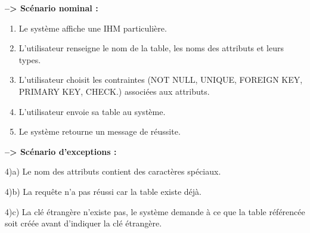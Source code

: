 \textbf{--> Scénario nominal :}
\begin{enumerate}
\item Le système affiche une IHM particulière.
\item L'utilisateur renseigne le nom de la table, les noms des attributs et leurs types.
\item L'utilisateur choisit les contraintes (NOT NULL, UNIQUE, FOREIGN KEY, PRIMARY KEY, CHECK.) associées aux attributs.
\item L'utilisateur envoie sa table au système.
\item Le système retourne un message de réussite.
\end{enumerate}

\textbf{--> Scénario d'exceptions :}
\begin{description}
\item 4)a) Le nom des attributs contient des caractères spéciaux.
\item 4)b) La requête n'a pas réussi car la table existe déjà.
\item 4)c) La clé étrangère n'existe pas, le système demande à ce que la table référencée soit créée avant d'indiquer la clé étrangère.
\end{description}
